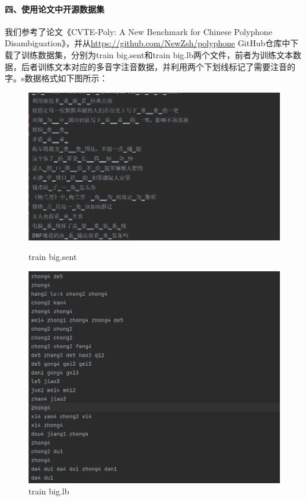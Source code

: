 \documentclass[12pt,hyperref,a4paper,UTF8]{ctexart}
\begin{document}
\paragraph{四、使用论文中开源数据集}
我们参考了论文《CVTE-Poly: A New Benchmark for Chinese Polyphone Disambiguation》，并从\url{https://github.com/NewZsh/polyphone} GitHub仓库中下载了训练数据集，分别为train big.sent和train big.lb两个文件，前者为训练文本数据，后者训练文本对应的多音字注音数据，并利用两个下划线标记了需要注音的字。s数据格式如下图所示：
\begin{figure}[htbp]
    \centering
    \begin{minipage}[b]{0.45\textwidth}
        \centering
        \includegraphics[width=\textwidth]{figures/image3.png} %
        \caption{train big.sent}
        \label{fig:image3}
    \end{minipage}
    \hspace{0.05\textwidth} %
    \begin{minipage}[b]{0.45\textwidth}
        \centering
        \includegraphics[width=\textwidth]{figures/image4.png} %
        \caption{train big.lb }
        \label{fig:image4}
    \end{minipage}
\end{figure}
\end{document}
